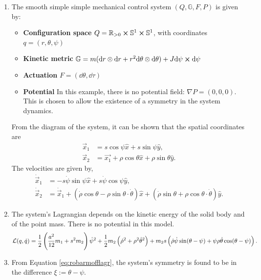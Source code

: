 \documentclass[main.tex]{subfiles}
\begin{document}
\begin{enumerate}[(1)]
\item The smooth simple simple mechanical control system $(Q,\mathbb{G},F,P)$ is given by:
\begin{itemize}
    \item \textbf{Configuration space} $Q=\mathbb{R}_{>0}\cross\mathbb{S}^1\cross\mathbb{S}^1$, with coordinates $q=(r,\theta,\psi)$
    \item \textbf{Kinetic metric} $\mathbb{G}=m(\dd r\otimes\dd r + r^2\dd\theta\otimes\dd\theta)+J\dd\psi\cross\dd\psi$
    \item \textbf{Actuation} $F=(\dd \theta,\dd \tau)$
    \item \textbf{Potential} In this example, there is no potential field: $\nabla P=(0,0,0)$. This is chosen to allow the existence of a symmetry in the system dynamics.
\end{itemize}
From the diagram of the system, it can be shown that the spatial coordinates are
\begin{align}
    \Vec{x}_1&=s\cos\psi\hat{x}+s\sin\psi\hat{y},\\
    \Vec{x}_2&=\Vec{x_1}+\rho\cos\theta\hat{x}+\rho\sin\theta\hat{y}.
\end{align}
The velocities are given by,
\begin{align}
    \dot{\Vec{x}}_1&=-s\dot\psi\sin\psi\hat{x}+s\dot\psi\cos\psi\hat{y},\\
    \dot{\Vec{x}}_2&=\dot{\Vec{x}}_1+(\dot\rho\cos\theta-\rho\sin\theta\cdot\dot\theta)\hat{x}+(\dot\rho\sin\theta+\rho\cos\theta\cdot\dot\theta)\hat{y}.
\end{align}
\item The system's Lagrangian depends on the kinetic energy of the solid body and of the point mass. There is no potential in this model.
\begin{align}
    \Lagr(q,\qd)=\frac{1}{2}\del{\frac{a^2}{12}m_1+s^2m_2}\dot{\psi}^2+\frac{1}{2}m_2\del{\dot\rho^2+\rho^2\dot\theta^2}+m_2s\del{\dot\rho\dot\psi\sin(\theta-\psi)+\psi\rho\dot\theta\cos(\theta-\psi)}.\label{eq:robarmofflagr}
\end{align}
\item From Equation \ref{eq:robarmofflagr}, the system's symmetry is found to be in the difference $\xi:=\theta-\psi$. 

\end{enumerate}
\end{document}
